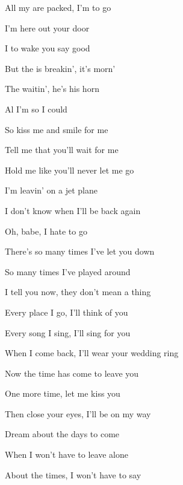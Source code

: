 

\zs
All my  are packed, I'm  to go

I'm  here out your door

I  to wake you  say good

But the  is breakin', it's  morn'

The  waitin', he's  his horn

Al I'm so  I could 
\ks

\zr
So kiss me and smile for me

Tell me that you'll wait for me

Hold me like you'll never let me go

I'm leavin' on a jet plane

I don't know when I'll be back again

Oh, babe, I hate to go
\kr

\zs
There's so many times I've let you down

So many times I've played around

I tell you now, they don't mean a thing

Every place I go, I'll think of you

Every song I sing, I'll sing for you

When I come back, I'll wear your wedding ring
\ks

\zr\kr

\zs
Now the time has come to leave you

One more time, let me kiss you

Then close your eyes, I'll be on my way

Dream about the days to come

When I won't have to leave alone

About the times, I won't have to say
\ks

\zr\kr

\kp
